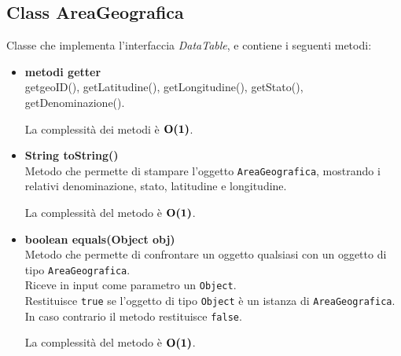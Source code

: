 \documentclass[a4paper, 12pt]{scrreprt}
\begin{document}
			\subsection{Class AreaGeografica}
			Classe che implementa l'interfaccia \textsl{DataTable}, e contiene i seguenti metodi:
				\begin{itemize}
				\item \textbf{metodi getter}
				\\getgeoID(), getLatitudine(), getLongitudine(), getStato(), getDenominazione().

				La complessit\`a dei metodi \`e $\mathbf{O}\textbf{(1)}$.

				\item \textbf{String toString()}
				\\Metodo che permette di stampare l'oggetto \verb!AreaGeografica!, mostrando i relativi denominazione, stato, latitudine e longitudine.

				La complessit\`a del metodo \`e $\mathbf{O}\textbf{(1)}$.

				\item \textbf{boolean equals(Object obj)}
				\\Metodo che permette di confrontare un oggetto qualsiasi con un oggetto di tipo \verb!AreaGeografica!.
				\\Riceve in input come parametro un \verb!Object!.
				\\Restituisce \verb!true! se l'oggetto di tipo \verb!Object! \`e un istanza di \verb!AreaGeografica!.
				\\In caso contrario il metodo restituisce \verb!false!.

				La complessit\`a del metodo \`e $\mathbf{O}\textbf{(1)}$.

			\end{itemize}
\pagebreak
\end{document}

